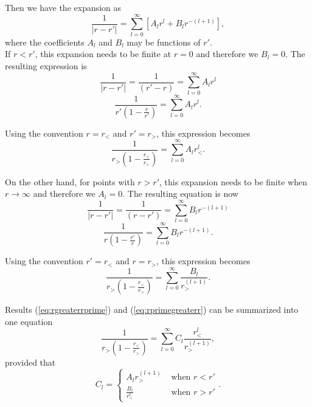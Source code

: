 Then we have the expansion as
\begin{equation}
  \frac{1}{\left| r - r' \right|} = \sum_{l=0} ^\infty \left[ A_l r^l + B_l r^{-(l+1)} \right],
 \end{equation}
 where the coefficients $A_l$ and $B_l$ may be functions of $r'$.\\
 
If $r<r'$, this expansion needs to be finite at $r=0$ and therefore we $B_l=0$. The resulting expression is
\begin{equation}
  \frac{1}{\left| r - r' \right|} =   \frac{1}{( r' - r )} = \sum_{l=0} ^\infty A_l r^l 
\end{equation} 
\begin{equation}
  \frac{1}{r'\left( 1 - \frac{r}{r'} \right)} = \sum_{l=0} ^\infty A_l r^l .
 \end{equation} 
 
Using the convention $r=r_<$ and $r'=r_>$, this expression becomes 
  \begin{equation}
  \frac{1}{r_>\left( 1 - \frac{r_<}{r_>} \right)} = \sum_{l=0} ^\infty A_l r^l _<. \label{eq:rgreaterrprime}
 \end{equation} 
 
 On the other hand, for points with  $r>r'$, this expansion needs to be finite when $r\rightarrow \infty$ and therefore we $A_l=0$. The resulting equation is now
\begin{equation}
  \frac{1}{\left| r - r' \right|} =   \frac{1}{( r - r' )} = \sum_{l=0} ^\infty B_l r^{-(l+1)}
 \end{equation} 
 \begin{equation}
  \frac{1}{r\left( 1 - \frac{r'}{r} \right)} = \sum_{l=0} ^\infty B_l r^{-(l+1)} .
 \end{equation} 
 
Using the convention $r'=r_<$ and $r=r_>$, this expression becomes 
\begin{equation}
\frac{1}{r_>\left( 1 - \frac{r_<}{r_>} \right)} = \sum_{l=0} ^\infty \frac{B_l}{ r^{(l+1)}_> } .\label{eq:rprimegreaterr}
\end{equation} 
 
Results (\ref{eq:rgreaterrprime}) and (\ref{eq:rprimegreaterr}) can be summarized into one equation
\begin{equation}
\frac{1}{r_>\left( 1 - \frac{r_<}{r_>} \right)} = \sum_{l=0} ^\infty C_l \frac{r^l _<}{ r^{(l+1)}_> } , \label{eq:generalExpansion}
\end{equation}    
provided that 
\begin{equation}
C_l = 
\begin{cases}
 A_l r^{(l+1)}_>  &\text{ when } r<r'\\
\frac{B_l }{r^l _<} &\text{ when } r>r'
\end{cases} .
\end{equation}
 

